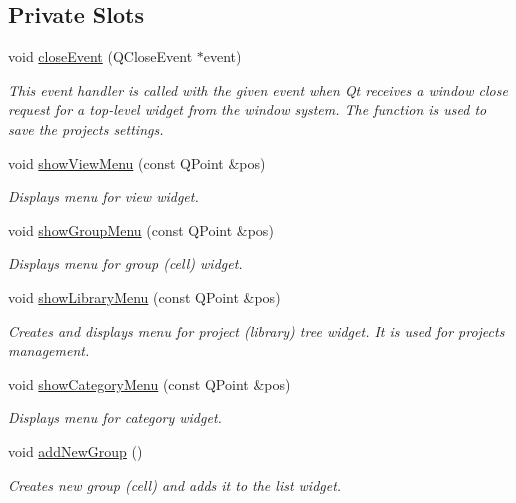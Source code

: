 \subsection*{Private Slots}
\begin{DoxyCompactItemize}
\item 
void \hyperlink{classMainWindow_a4e20a4a065fbb0e4d3532a45a0a91425}{close\-Event} (Q\-Close\-Event $\ast$event)
\begin{DoxyCompactList}\small\item\em This event handler is called with the given event when Qt receives a window close request for a top-\/level widget from the window system. The function is used to save the projects settings. \end{DoxyCompactList}\item 
void \hyperlink{classMainWindow_a9a11decabf7bc3f32641bc59431bee3c}{show\-View\-Menu} (const Q\-Point \&pos)
\begin{DoxyCompactList}\small\item\em Displays menu for view widget. \end{DoxyCompactList}\item 
void \hyperlink{classMainWindow_a19879440aaeb18585b7fac488e540c49}{show\-Group\-Menu} (const Q\-Point \&pos)
\begin{DoxyCompactList}\small\item\em Displays menu for group (cell) widget. \end{DoxyCompactList}\item 
void \hyperlink{classMainWindow_aefeae0de6c70fcace6f9f4b3836d8a84}{show\-Library\-Menu} (const Q\-Point \&pos)
\begin{DoxyCompactList}\small\item\em Creates and displays menu for project (library) tree widget. It is used for projects management. \end{DoxyCompactList}\item 
void \hyperlink{classMainWindow_acd00c7003f796ac714582e3238788872}{show\-Category\-Menu} (const Q\-Point \&pos)
\begin{DoxyCompactList}\small\item\em Displays menu for category widget. \end{DoxyCompactList}\item 
void \hyperlink{classMainWindow_a565b14903c7bc11126bce1307afaa2e2}{add\-New\-Group} ()
\begin{DoxyCompactList}\small\item\em Creates new group (cell) and adds it to the list widget. \end{DoxyCompactList}\item 

\end{DoxyCompactItemize}

